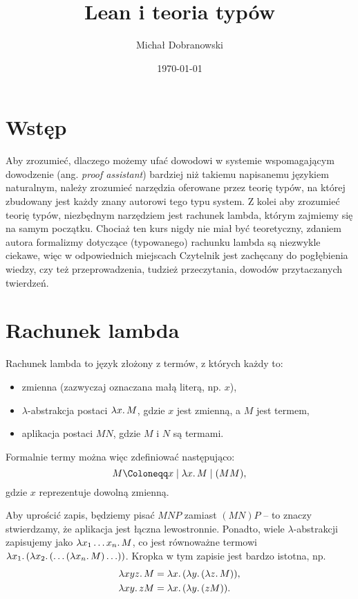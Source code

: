 \documentclass[polish,pretty]{angav}
\title{Lean i teoria typów}
\author{Michał Dobranowski}
\date{\today}
\begin{document}
\maketitle

\section{Wstęp}

Aby zrozumieć, dlaczego możemy ufać dowodowi w systemie wspomagającym dowodzenie (ang. \textit{proof assistant}) bardziej niż takiemu napisanemu językiem naturalnym, należy zrozumieć narzędzia oferowane przez teorię typów, na której zbudowany jest każdy znany autorowi tego typu system.
Z kolei aby zrozumieć teorię typów, niezbędnym narzędziem jest rachunek lambda, którym zajmiemy się na samym początku.
Chociaż ten kurs nigdy nie miał być teoretyczny, zdaniem autora formalizmy dotyczące (typowanego) rachunku lambda są niezwykle ciekawe, więc w odpowiednich miejscach Czytelnik jest zachęcany do pogłębienia wiedzy, czy też przeprowadzenia, tudzież przeczytania, dowodów przytaczanych twierdzeń.

\section{Rachunek lambda}

Rachunek lambda to język złożony z termów, z których każdy to:
\begin{itemize}
    \item zmienna (zazwyczaj oznaczana małą literą, np. $x$),
    \item $\lambda$-abstrakcja postaci $\lambda x\ldotp M$, gdzie $x$ jest zmienną, a $M$ jest termem,
    \item aplikacja postaci $MN$, gdzie $M$ i $N$ są termami.
\end{itemize}

Formalnie termy można więc zdefiniować następująco:
\[ M \Coloneqq x \mid \lambda x\ldotp M \mid (MM), \]
gdzie $x$ reprezentuje dowolną zmienną.

Aby uprościć zapis, będziemy pisać $MNP$ zamiast $(MN)P$ -- to znaczy stwierdzamy, że aplikacja jest łączna lewostronnie. Ponadto, wiele $\lambda$-abstrakcji zapisujemy jako $\lambda x_1 \ldots x_n\ldotp M$, co jest równoważne termowi $\lambda x_1\ldotp (\lambda x_2\ldotp (\ldots (\lambda x_n\ldotp M) \ldots))$. Kropka w tym zapisie jest bardzo istotna, np.
\begin{align*}
    \lambda xyz\ldotp M &= \lambda x\ldotp (\lambda y\ldotp (\lambda z\ldotp M)), \\
    \lambda xy\ldotp z M &= \lambda x\ldotp (\lambda y\ldotp (z M)).
\end{align*}
\end{document}
